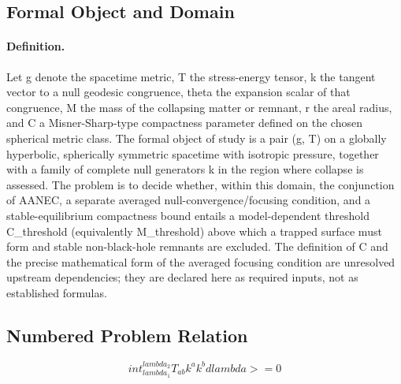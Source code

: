 \documentclass[conference]{IEEEtran}
\begin{document}
\subsection{Formal Object and Domain}
\paragraph{Definition.} Let g denote the spacetime metric, T the stress-energy tensor, k the tangent vector to a null geodesic congruence, theta the expansion scalar of that congruence, M the mass of the collapsing matter or remnant, r the areal radius, and C a Misner-Sharp-type compactness parameter defined on the chosen spherical metric class. The formal object of study is a pair (g, T) on a globally hyperbolic, spherically symmetric spacetime with isotropic pressure, together with a family of complete null generators k in the region where collapse is assessed. The problem is to decide whether, within this domain, the conjunction of AANEC, a separate averaged null-convergence/focusing condition, and a stable-equilibrium compactness bound entails a model-dependent threshold C\_threshold (equivalently M\_threshold) above which a trapped surface must form and stable non-black-hole remnants are excluded. The definition of C and the precise mathematical form of the averaged focusing condition are unresolved upstream dependencies; they are declared here as required inputs, not as established formulas.

\subsection{Numbered Problem Relation}
\begin{equation}
int_{lambda_1}^{lambda_2} T_{ab} k^a k^b dlambda >= 0
\label{eq:formal-problem-and-hypotheses-fp-03}
\end{equation}~\cite{cite_0ed84243cf171bc4}
\end{document}
